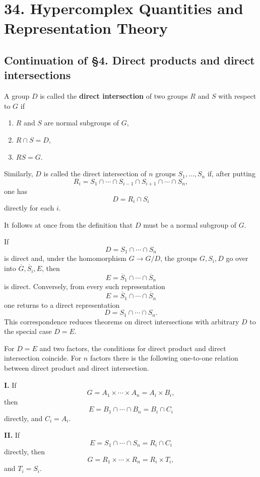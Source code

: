 \documentclass[11pt]{article}
\begin{document}
\section{34. Hypercomplex Quantities and Representation
Theory}\label{hypercomplex-quantities-and-representation-theory}

\subsection{Continuation of §4. Direct products and direct
intersections}\label{continuation-of-4.-direct-products-and-direct-intersections}

A group \(D\) is called the \textbf{direct intersection} of two groups
\(R\) and \(S\) with respect to \(G\) if

\begin{enumerate}
\def\labelenumi{\alph{enumi})}
\item
  \(R\) and \(S\) are normal subgroups of \(G\),
\item
  \(R\cap S=D\),
\item
  \(RS=G\).
\end{enumerate}

Similarly, \(D\) is called the direct intersection of \(n\) groups
\(S_1,\ldots,S_n\) if, after putting \[
  R_i=S_1\cap\cdots\cap S_{i-1}\cap S_{i+1}\cap\cdots\cap S_n,
\] one has \[
  D=R_i\cap S_i
\] directly for each \(i\).

It follows at once from the definition that \(D\) must be a normal
subgroup of \(G\).

If \[
  D=S_1\cap\cdots\cap S_n
\] is direct and, under the homomorphism \(G\to G/D\), the groups
\(G,S_i,D\) go over into \(\overline G,\overline S_i,E\), then \[
  E=\overline S_1\cap\cdots\cap\overline S_n
\] is direct. Conversely, from every such representation \[
  E=\overline S_1\cap\cdots\cap\overline S_n
\] one returns to a direct representation \[
  D=S_1\cap\cdots\cap S_n.
\] This correspondence reduces theorems on direct intersections with
arbitrary \(D\) to the special case \(D=E\).

For \(D=E\) and two factors, the conditions for direct product and
direct intersection coincide. For \(n\) factors there is the following
one-to-one relation between direct product and direct intersection.

\textbf{I.} If \[
  G=A_1\times\cdots\times A_n=A_i\times B_i,
\] then \[
  E=B_1\cap\cdots\cap B_n=B_i\cap C_i
\] directly, and \(C_i=A_i\).

\textbf{II.} If \[
  E=S_1\cap\cdots\cap S_n=R_i\cap C_i
\] directly, then \[
  G=R_1\times\cdots\times R_n=R_i\times T_i,
\] and \(T_i=S_i\).
\end{document}
